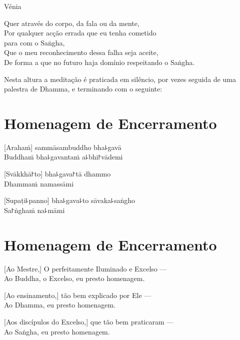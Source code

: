 \enlargethispage{\baselineskip}

\vfill

\begin{instruction}
  Vénia
\end{instruction}

Quer através do corpo, da fala ou da mente,\\
Por qualquer acção errada que eu tenha cometido\\
\vin para com o Saṅgha,\\
Que o meu reconhecimento dessa falha seja aceite,\\
De forma a que no futuro haja domínio respeitando o Saṅgha.

\begin{instruction}
  Nesta altura a meditação é praticada em silêncio, por vezes seguida de uma palestra de Dhamma, e terminando com o seguinte:
\end{instruction}

\clearpage

\chapter*{Homenagem de Encerramento}

\delegateSetUseNext

[Arahaṁ] sammāsambuddho bha꜕gavā\\
Buddhaṁ bha꜕gavantaṁ a꜕bhi꜓vādemi 

[Svākkhā꜓to] bha꜕gava꜓tā dhammo\\
Dhammaṁ namassāmi 

[Supaṭi꜕panno] bha꜕gava꜕to sāvaka꜕saṅgho\\
Sa꜓ṅghaṁ na꜕māmi 

\clearpage

\chapter{Homenagem de Encerramento}

[Ao Mestre,] O perfeitamente Iluminado e Excelso ---\\
Ao Buddha, o Excelso, eu presto homenagem. 

[Ao ensinamento,] tão bem explicado por Ele ---\\
Ao Dhamma, eu presto homenagem. 

[Aos discípulos do Excelso,] que tão bem praticaram ---\\
Ao Saṅgha, eu presto homenagem. 

